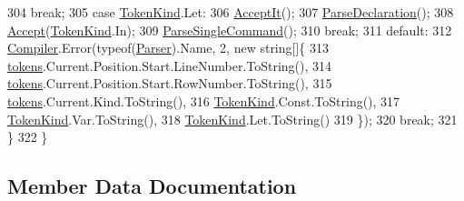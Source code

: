 \begin{DoxyCode}
304                                 \textcolor{keywordflow}{break};
305                             \textcolor{keywordflow}{case} \mbox{\hyperlink{namespace_compiler_a57929962f25004759596fc3f13cf563c}{TokenKind}}.Let:
306                                 \mbox{\hyperlink{class_compiler_1_1_parser_ae19e507e1e2460cbad35b03d24402b4f}{AcceptIt}}();
307                                 \mbox{\hyperlink{class_compiler_1_1_parser_ab9718b82a785e63b848e51c39bbe8ee7}{ParseDeclaration}}();
308                                 \mbox{\hyperlink{class_compiler_1_1_parser_aaedaac51ec193dd68541fd9d39fddde8}{Accept}}(\mbox{\hyperlink{namespace_compiler_a57929962f25004759596fc3f13cf563c}{TokenKind}}.In);
309                                 \mbox{\hyperlink{class_compiler_1_1_parser_af315f582be84f8e1b37add91efa3afc0}{ParseSingleCommand}}();
310                                 \textcolor{keywordflow}{break};
311                             \textcolor{keywordflow}{default}:
312                                 \mbox{\hyperlink{namespace_compiler}{Compiler}}.Error(typeof(\mbox{\hyperlink{class_compiler_1_1_parser_a450e11452db3f91ff866fc1e36ebc79d}{Parser}}).Name, 2, \textcolor{keyword}{new} \textcolor{keywordtype}{string}[]\{
313                                     \mbox{\hyperlink{class_compiler_1_1_parser_a4db075175c853a197c7b8db7d787a0a5}{tokens}}.Current.Position.Start.LineNumber.ToString(),
314                                     \mbox{\hyperlink{class_compiler_1_1_parser_a4db075175c853a197c7b8db7d787a0a5}{tokens}}.Current.Position.Start.RowNumber.ToString(),
315                                     \mbox{\hyperlink{class_compiler_1_1_parser_a4db075175c853a197c7b8db7d787a0a5}{tokens}}.Current.Kind.ToString(),
316                                     \mbox{\hyperlink{namespace_compiler_a57929962f25004759596fc3f13cf563c}{TokenKind}}.Const.ToString(),
317                                     \mbox{\hyperlink{namespace_compiler_a57929962f25004759596fc3f13cf563c}{TokenKind}}.Var.ToString(),
318                                     \mbox{\hyperlink{namespace_compiler_a57929962f25004759596fc3f13cf563c}{TokenKind}}.Let.ToString()
319                                 \});
320                                 \textcolor{keywordflow}{break};
321                         \}
322                     \}
\end{DoxyCode}


\subsection{Member Data Documentation}
\mbox{\label{class_compiler_1_1_parser_ac30c9381b172d482cc5bb1356c5a901b}} 
